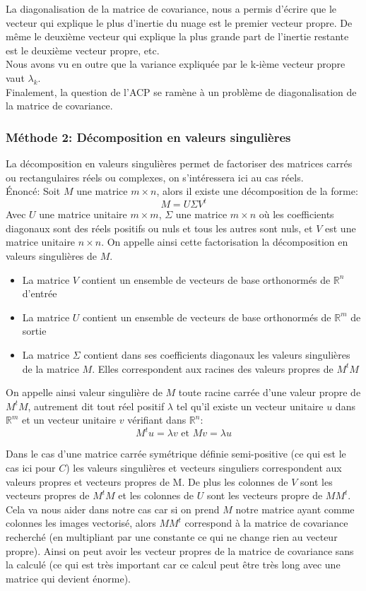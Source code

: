 \documentclass[12pt,french]{article}
\theoremstyle{plain}
\theoremstyle{definition}
\begin{document}
La diagonalisation de la matrice de covariance, nous a permis d'écrire que le vecteur qui explique le plus d'inertie du nuage est le premier vecteur propre.
De même le deuxième vecteur qui explique la plus grande part de l'inertie restante est le deuxième vecteur propre, etc.\\
Nous avons vu en outre que la variance expliquée par le k-ième vecteur propre vaut $\lambda_k$.\\
Finalement, la question de l'ACP se ramène à un problème de diagonalisation de la matrice de covariance.

\subsubsection{Méthode 2: Décomposition en valeurs singulières}

La décomposition en valeurs singulières permet de factoriser des matrices carrés ou rectangulaires réels ou complexes, on s'intéressera ici au cas réels. \\
Énoncé: Soit $M$ une matrice $m \times n$, alors il existe une décomposition de la forme: \\
$$M=U\Sigma V^t$$
Avec $U$ une matrice unitaire $m \times m$, $\Sigma$ une matrice $m\times n$ où les coefficients diagonaux sont des réels positifs ou nuls et tous les autres sont nuls, et $V$ est une matrice unitaire $n \times n$. On appelle ainsi cette factorisation la décomposition en valeurs singulières de $M$.
\begin{itemize}
\item La matrice $V$ contient un ensemble de vecteurs de base orthonormés de $\mathbb{R}^n$ d'entrée
\item La matrice $U$ contient un ensemble de vecteurs de base orthonormés de $\mathbb{R}^m$ de sortie
\item La matrice $\Sigma$ contient dans ses coefficients diagonaux les valeurs singulières de la matrice $M$. Elles correspondent aux racines des valeurs propres de $M^t M$
\end{itemize}

On appelle ainsi valeur singulière de $M$ toute racine carrée d'une valeur propre de $M^t M$, autrement dit tout réel positif $\lambda$ tel qu'il existe un vecteur unitaire $u$ dans $\mathbb{R}^m$ et un vecteur unitaire $v$ vérifiant dans $\mathbb{R}^n$:
$$ M^t u = \lambda v \text{ et } Mv = \lambda u$$

Dans le cas d'une matrice carrée symétrique définie semi-positive (ce qui est le cas ici pour $C$) les valeurs singulières et vecteurs singuliers correspondent aux valeurs propres et vecteurs propres de M.
De plus les colonnes de $V$ sont les vecteurs propres de $M^tM$ et les colonnes de $U$ sont les vecteurs propre de $MM^t$. Cela va nous aider dans notre cas car si on prend $M$ notre matrice ayant comme colonnes les images vectorisé, alors $MM^t$ correspond à la matrice de covariance recherché (en multipliant par une constante ce qui ne change rien au vecteur propre). Ainsi on peut avoir les vecteur propres de la matrice de covariance sans la calculé (ce qui est très important car ce calcul peut être très long avec une matrice qui devient énorme). 
\end{document}
